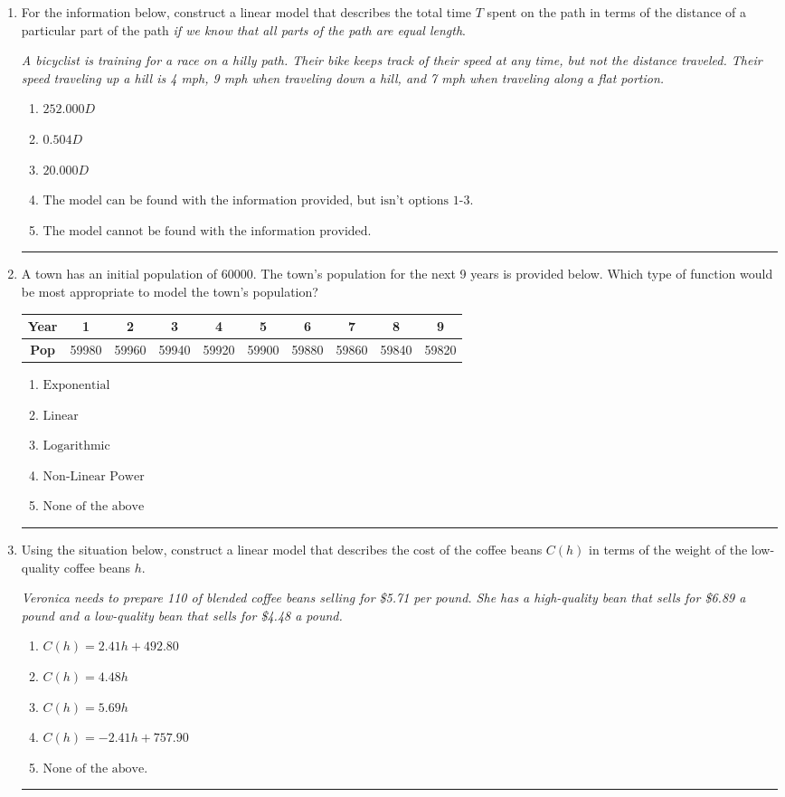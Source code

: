 \documentclass[14pt]{extbook}
\newcommand{\litem}[1]{\item#1\hspace*{-1cm}\rule{\textwidth}{0.4pt}}
\begin{document}
\begin{enumerate}
{\begin{enumerate}[label=\Alph*.]
\end{enumerate} }
\litem{
For the information below, construct a linear model that describes the total time $T$ spent on the path in terms of the distance of a particular part of the path \textit{if we know that all parts of the path are equal length}.
\begin{center}
    \textit{ A bicyclist is training for a race on a hilly path. Their bike keeps track of their speed at any time, but not the distance traveled. Their speed traveling up a hill is 4 mph, 9 mph when traveling down a hill, and 7 mph when traveling along a flat portion. }
\end{center}
\begin{enumerate}[label=\Alph*.]
\item \( 252.000 D \)
\item \( 0.504 D \)
\item \( 20.000 D \)
\item \( \text{The model can be found with the information provided, but isn't options 1-3.} \)
\item \( \text{The model cannot be found with the information provided.} \)

\end{enumerate} }
\litem{
A town has an initial population of 60000. The town's population for the next 9 years is provided below. Which type of function would be most appropriate to model the town's population?

\begin{tabular}{c|c|c|c|c|c|c|c|c|c}
\textbf{Year} &1 &2 &3 &4 &5 &6 &7 &8 &9\tabularnewline \hline
\textbf{Pop} &59980 &59960 &59940 &59920 &59900 &59880 &59860 &59840 &59820\end{tabular}\begin{enumerate}[label=\Alph*.]
\item \( \text{Exponential} \)
\item \( \text{Linear} \)
\item \( \text{Logarithmic} \)
\item \( \text{Non-Linear Power} \)
\item \( \text{None of the above} \)

\end{enumerate} }
\litem{
Using the situation below, construct a linear model that describes the cost of the coffee beans $C(h)$ in terms of the weight of the low-quality coffee beans $h$.
\begin{center}
    \textit{ Veronica needs to prepare 110 of blended coffee beans selling for \$5.71 per pound. She has a high-quality bean that sells for \$6.89 a pound and a low-quality bean that sells for \$4.48 a pound. }
\end{center}
\begin{enumerate}[label=\Alph*.]
\item \( C(h) = 2.41 h + 492.80 \)
\item \( C(h) = 4.48 h \)
\item \( C(h) = 5.69 h \)
\item \( C(h) = -2.41 h + 757.90 \)
\item \( \text{None of the above.} \)


\end{enumerate}}
\end{enumerate}
\end{document}
